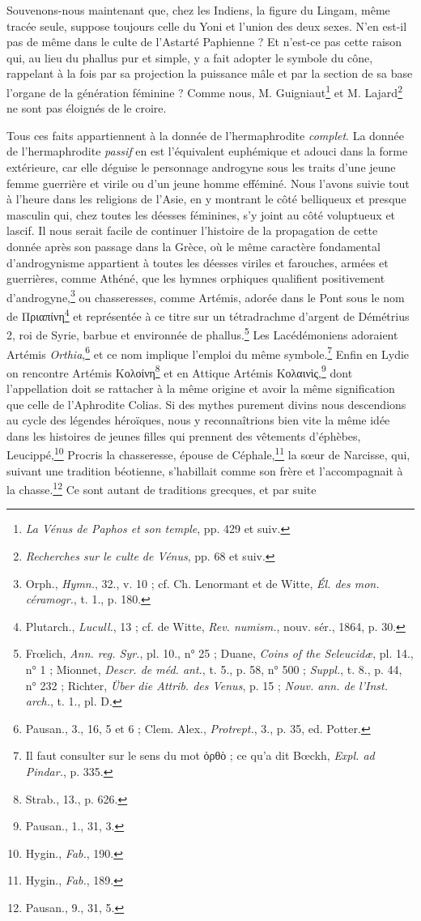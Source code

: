 \documentclass[a4paper, 11pt, oneside, landscape]{article}
\begin{document}
Souvenons-nous maintenant que, chez les Indiens, la figure du Lingam, même tracée seule, suppose toujours celle du Yoni et l'union des deux sexes. N'en est-il pas de même dans le culte de l'Astarté Paphienne ? Et n'est-ce pas cette raison qui, au lieu du phallus pur et simple, y a fait adopter le symbole du cône, rappelant à la fois par sa projection la puissance mâle et par la section de sa base l'organe de la génération féminine ? Comme nous, M. Guigniaut\footnote{\emph{La Vénus de Paphos et son temple}, pp. 429 et suiv.} et M. Lajard\footnote{\emph{Recherches sur le culte de Vénus}, pp. 68 et suiv.} ne sont pas éloignés de le croire.

Tous ces faits appartiennent à la donnée de l'hermaphrodite \emph{complet}. La donnée de l'hermaphrodite \emph{passif} en est l'équivalent euphémique et adouci dans la forme extérieure, car elle déguise le personnage androgyne sous les traits d'une jeune femme guerrière et virile ou d'un jeune homme efféminé. Nous l'avons suivie tout à l'heure dans les religions de l'Asie, en y montrant le côté belliqueux et presque masculin qui, chez toutes les déesses féminines, s'y joint au côté voluptueux et lascif. Il nous serait facile de continuer l'histoire de la propagation de cette donnée après son passage dans la Grèce, où le même caractère fondamental d'androgynisme appartient à toutes les déesses viriles et farouches, armées et guerrières, comme Athéné, que les hymnes orphiques qualifient positivement d'androgyne,\footnote{Orph., \emph{Hymn.}, 32., v. 10 ; cf. Ch. Lenormant et de Witte, \emph{Él. des mon. céramogr.}, t. 1., p. 180.} ou chasseresses, comme Artémis, adorée dans le Pont sous le nom de Πριαπίνη\footnote{Plutarch., \emph{Lucull.}, 13 ; cf. de Witte, \emph{Rev. numism.}, nouv. sér., 1864, p. 30.} et représentée à ce titre sur un tétradrachme d'argent de Démétrius 2, roi de Syrie, barbue et environnée de phallus.\footnote{Frœlich, \emph{Ann. reg. Syr.}, pl. 10., n° 25 ; Duane, \emph{Coins of the Seleucidæ}, pl. 14., n° 1 ; Mionnet, \emph{Descr. de méd. ant.}, t. 5., p. 58, n° 500 ; \emph{Suppl.}, t. 8., p. 44, n° 232 ; Richter, \emph{Über die Attrib. des Venus}, p. 15 ; \emph{Nouv. ann. de l'Inst. arch.}, t. 1., pl. D.} Les Lacédémoniens adoraient Artémis \emph{Orthia},\footnote{Pausan., 3., 16, 5 et 6 ; Clem. Alex., \emph{Protrept.}, 3., p. 35, ed. Potter.} et ce nom implique l'emploi du même symbole.\footnote{Il faut consulter sur le sens du mot ὀρθὸ ; ce qu'a dit Bœckh, \emph{Expl. ad Pindar.}, p. 335.} Enfin en Lydie on rencontre Artémis Κολοίνη\footnote{Strab., 13., p. 626.} et en Attique Artémis Κολαινὶς,\footnote{Pausan., 1., 31, 3.} dont l'appellation doit se rattacher à la même origine et avoir la même signification que celle de l'Aphrodite Colias. Si des mythes purement divins nous descendions au cycle des légendes héroïques, nous y reconnaîtrions bien vite la même idée dans les histoires de jeunes filles qui prennent des vêtements d'éphèbes, Leucippé,\footnote{Hygin., \emph{Fab.}, 190.} Procris la chasseresse, épouse de Céphale,\footnote{Hygin., \emph{Fab.}, 189.} la sœur de Narcisse, qui, suivant une tradition béotienne, s'habillait comme son frère et l'accompagnait à la chasse.\footnote{Pausan., 9., 31, 5.} Ce sont autant de traditions grecques, et par suite 
\end{document}
